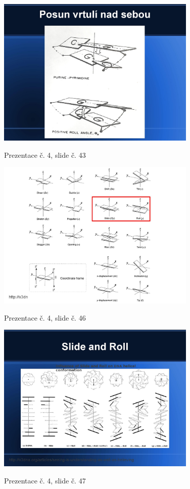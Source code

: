 \documentclass[DIV=8]{scrreprt}
\begin{document}
\begin{figure}
    \caption{Prezentace č. 4, slide č. 43}
    \includegraphics[width=0.85\textwidth]{slides-4/slide-43.jpg}
    \centering
    \label{slides-4-slide-43}
\end{figure}
\begin{figure}
    \caption{Prezentace č. 4, slide č. 46}
    \includegraphics[width=0.85\textwidth]{slides-4/slide-46.jpg}
    \centering
    \label{slides-4-slide-46}
\end{figure}
\begin{figure}
    \caption{Prezentace č. 4, slide č. 47}
    \includegraphics[width=0.85\textwidth]{slides-4/slide-47.jpg}
    \centering
    \label{slides-4-slide-47}
\end{figure}
\end{document}
